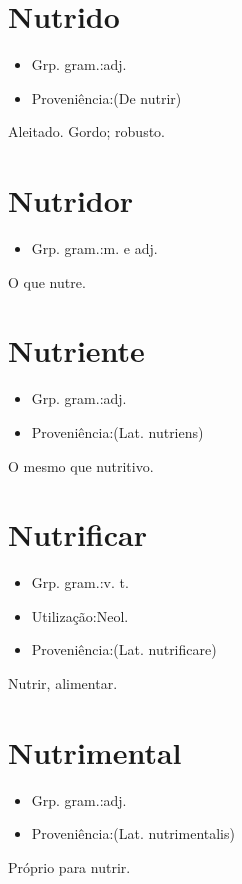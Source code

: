 \section{Nutrido}
\begin{itemize}
\item {Grp. gram.:adj.}
\end{itemize}
\begin{itemize}
\item {Proveniência:(De \textunderscore nutrir\textunderscore )}
\end{itemize}
Aleitado.
Gordo; robusto.
\section{Nutridor}
\begin{itemize}
\item {Grp. gram.:m.  e  adj.}
\end{itemize}
O que nutre.
\section{Nutriente}
\begin{itemize}
\item {Grp. gram.:adj.}
\end{itemize}
\begin{itemize}
\item {Proveniência:(Lat. \textunderscore nutriens\textunderscore )}
\end{itemize}
O mesmo que \textunderscore nutritivo\textunderscore .
\section{Nutrificar}
\begin{itemize}
\item {Grp. gram.:v. t.}
\end{itemize}
\begin{itemize}
\item {Utilização:Neol.}
\end{itemize}
\begin{itemize}
\item {Proveniência:(Lat. \textunderscore nutrificare\textunderscore )}
\end{itemize}
Nutrir, alimentar.
\section{Nutrimental}
\begin{itemize}
\item {Grp. gram.:adj.}
\end{itemize}
\begin{itemize}
\item {Proveniência:(Lat. \textunderscore nutrimentalis\textunderscore )}
\end{itemize}
Próprio para nutrir.
